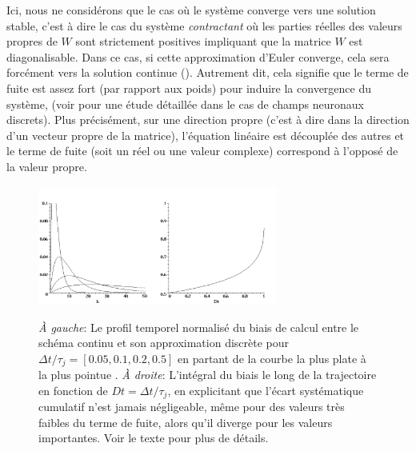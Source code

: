 Ici, nous ne considérons que le cas où le système converge vers une solution stable, c'est à dire le cas du système \textit{contractant} où les parties réelles des valeurs propres de ${W}$ sont strictement positives impliquant que la matrice ${W}$ est diagonalisable. Dans ce cas, si cette approximation d'Euler converge, cela sera forcément vers la solution continue (\cite{Press:1988}). Autrement dit, cela signifie que le terme de fuite est assez fort (par rapport aux poids) pour induire la convergence du système, (voir \cite {Alexandre:2009} pour une étude détaillée dans le cas de champs neuronaux discrets). Plus précisément, sur une direction propre (c'est à dire dans la direction d'un vecteur propre de la matrice), l'équation linéaire est découplée des autres et le terme de fuite (soit un réel ou une valeur complexe) correspond à l'opposé de la valeur propre. \\
 
\begin{figure}[htbp]
\begin{center}\includegraphics[width=0.35\textwidth]{figures/ch1_7_biais.jpeg}\includegraphics[width=0.35\textwidth]{figures/ch1_7_integralbiais.jpeg}\end{center}
\caption{{\em \`A gauche}: Le profil temporel normalisé du biais de calcul entre le schéma continu et son approximation discrète pour $\Delta t / \tau_j = [0.05, 0.1, 0.2, 0.5]$ en partant de la courbe la plus plate à la plus pointue .
{\em \`A droite}: L'intégral du biais le long de la trajectoire en fonction de $Dt=\Delta t / \tau_j$, en explicitant que l'écart systématique cumulatif n'est jamais négligeable, même pour des valeurs très faibles du terme de fuite, alors qu'il diverge pour les valeurs importantes. Voir le texte pour plus de détails.}
\label{fig: euler-error} 
\end{figure} 


